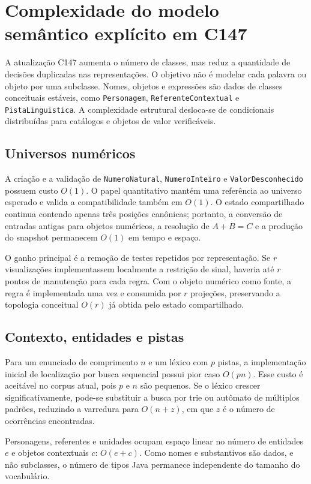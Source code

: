 \documentclass[12pt,a4paper]{article}
\begin{document}
\section{Complexidade do modelo semântico explícito em C147}

A atualização C147 aumenta o número de classes, mas reduz a quantidade de decisões duplicadas nas representações. O objetivo não é modelar cada palavra ou objeto por uma subclasse. Nomes, objetos e expressões são dados de classes conceituais estáveis, como \texttt{Personagem}, \texttt{ReferenteContextual} e \texttt{PistaLinguistica}. A complexidade estrutural desloca-se de condicionais distribuídas para catálogos e objetos de valor verificáveis.

\subsection{Universos numéricos}

A criação e a validação de \texttt{NumeroNatural}, \texttt{NumeroInteiro} e \texttt{ValorDesconhecido} possuem custo $O(1)$. O papel quantitativo mantém uma referência ao universo esperado e valida a compatibilidade também em $O(1)$. O estado compartilhado continua contendo apenas três posições canônicas; portanto, a conversão de entradas antigas para objetos numéricos, a resolução de $A+B=C$ e a produção do snapshot permanecem $O(1)$ em tempo e espaço.

O ganho principal é a remoção de testes repetidos por representação. Se $r$ visualizações implementassem localmente a restrição de sinal, haveria até $r$ pontos de manutenção para cada regra. Com o objeto numérico como fonte, a regra é implementada uma vez e consumida por $r$ projeções, preservando a topologia conceitual $O(r)$ já obtida pelo estado compartilhado.

\subsection{Contexto, entidades e pistas}

Para um enunciado de comprimento $n$ e um léxico com $p$ pistas, a implementação inicial de localização por busca sequencial possui pior caso $O(pn)$. Esse custo é aceitável no corpus atual, pois $p$ e $n$ são pequenos. Se o léxico crescer significativamente, pode-se substituir a busca por trie ou autômato de múltiplos padrões, reduzindo a varredura para $O(n+z)$, em que $z$ é o número de ocorrências encontradas.

Personagens, referentes e unidades ocupam espaço linear no número de entidades $e$ e objetos contextuais $c$: $O(e+c)$. Como nomes e substantivos são dados, e não subclasses, o número de tipos Java permanece independente do tamanho do vocabulário.
\end{document}
